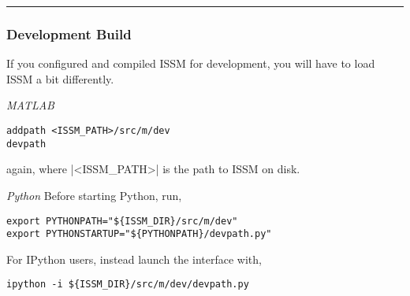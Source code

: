 \vspace{1cm}\hrule

\subsubsection{Development Build}
If you configured and compiled ISSM for development, you will have to load ISSM a bit differently.

\emph{MATLAB}
\begin{lstlisting}
addpath <ISSM_PATH>/src/m/dev
devpath
\end{lstlisting}
again, where \lstinlinebg|<ISSM_PATH>| is the path to ISSM on disk.

\emph{Python}
Before starting Python, run,
\begin{lstlisting}
export PYTHONPATH="${ISSM_DIR}/src/m/dev"
export PYTHONSTARTUP="${PYTHONPATH}/devpath.py"
\end{lstlisting}

For IPython users, instead launch the interface with,
\begin{lstlisting}
ipython -i ${ISSM_DIR}/src/m/dev/devpath.py
\end{lstlisting}

\clearpage %
